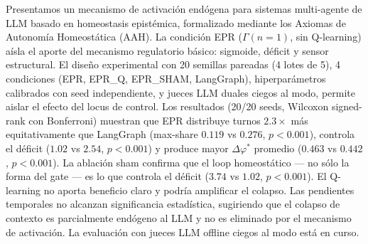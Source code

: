 \documentclass{llncs}
\begin{document}
Presentamos un mecanismo de activaci\'on end\'ogena para sistemas
multi-agente de LLM basado en homeostasis epist\'emica, formalizado
mediante los Axiomas de Autonom\'ia Homeost\'atica (AAH). La condici\'on
EPR ($\Gamma(n{=}1)$, sin Q-learning) a\'isla el aporte del mecanismo
regulatorio b\'asico: sigmoide, d\'eficit y sensor estructural. El
dise\~no experimental con 20 semillas pareadas (4 lotes de 5), 4 condiciones (EPR,
EPR\_Q, EPR\_SHAM, LangGraph), hiperpar\'ametros calibrados con seed
independiente, y jueces LLM duales ciegos al modo, permite aislar el
efecto del locus de control. Los resultados (20/20 seeds, Wilcoxon
signed-rank con Bonferroni) muestran que EPR distribuye turnos
$2.3\times$ m\'as equitativamente que LangGraph (max-share $0.119$ vs
$0.276$, $p<0.001$), controla el d\'eficit ($1.02$ vs $2.54$,
$p<0.001$) y produce mayor $\Delta\varphi^*$ promedio ($0.463$ vs
$0.442$, $p<0.001$). La ablaci\'on sham confirma que el loop
homeost\'atico --- no s\'olo la forma del gate --- es lo que controla el
d\'eficit ($3.74$ vs $1.02$, $p<0.001$). El Q-learning no aporta
beneficio claro y podr\'ia amplificar el colapso. Las pendientes
temporales no alcanzan significancia estad\'istica, sugiriendo que el
colapso de contexto es parcialmente end\'ogeno al LLM y no es eliminado
por el mecanismo de activaci\'on. La evaluaci\'on con jueces LLM
offline ciegos al modo est\'a en curso.

\printbibliography
\end{document}
